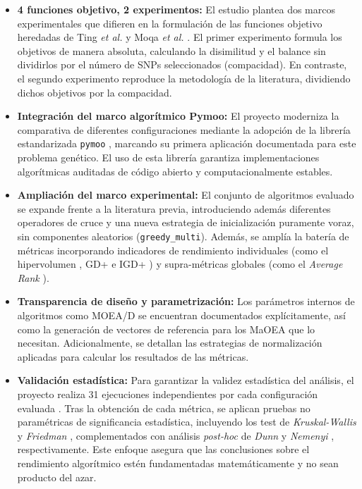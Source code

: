\begin{itemize}
    \item \textbf{4 funciones objetivo, 2 experimentos:} El estudio plantea dos marcos experimentales que difieren en la formulación de las funciones objetivo heredadas de Ting \textit{et al.} \cite{ting2010multi} y Moqa \textit{et al.} \cite{moqa2022assessing}. El primer experimento formula los objetivos de manera absoluta, calculando la disimilitud y el balance sin dividirlos por el número de SNPs seleccionados (compacidad). En contraste, el segundo experimento reproduce la metodología de la literatura, dividiendo dichos objetivos por la compacidad.
    \item \textbf{Integración del marco algorítmico Pymoo:} El proyecto moderniza la comparativa de diferentes configuraciones mediante la adopción de la librería estandarizada \texttt{pymoo} \cite{pymoo}, marcando su primera aplicación documentada para este problema genético. El uso de esta librería garantiza implementaciones algorítmicas auditadas de código abierto y computacionalmente estables.
    \item \textbf{Ampliación del marco experimental:} El conjunto de algoritmos evaluado se expande frente a la literatura previa, introduciendo además diferentes operadores de cruce y una nueva estrategia de inicialización puramente voraz, sin componentes aleatorios (\texttt{greedy\_multi}). Además, se amplía la batería de métricas incorporando indicadores de rendimiento individuales (como el hipervolumen \cite{zitzler1999multiobjective}, GD+ e IGD+ \cite{ishibuchi2015igd}) y supra-métricas globales (como el \textit{Average Rank} \cite{demsar2006statistical}).
    \item \textbf{Transparencia de diseño y parametrización:} Los parámetros internos de algoritmos como MOEA/D se encuentran documentados explícitamente, así como la generación de vectores de referencia para los MaOEA que lo necesitan. Adicionalmente, se detallan las estrategias de normalización aplicadas para calcular los resultados de las métricas.
    \item \textbf{Validación estadística:} Para garantizar la validez estadística del análisis, el proyecto realiza 31 ejecuciones independientes por cada configuración evaluada \cite{granado2020multiobjective}. Tras la obtención de cada métrica, se aplican pruebas no paramétricas de significancia estadística, incluyendo los test de \textit{Kruskal-Wallis} \cite{kruskal1952use} y \textit{Friedman} \cite{friedman1937use}, complementados con análisis \textit{post-hoc} de \textit{Dunn} \cite{dunn1964multiple} y \textit{Nemenyi} \cite{nemenyi1963distribution}, respectivamente. Este enfoque asegura que las conclusiones sobre el rendimiento algorítmico estén fundamentadas matemáticamente y no sean producto del azar.

\end{itemize}